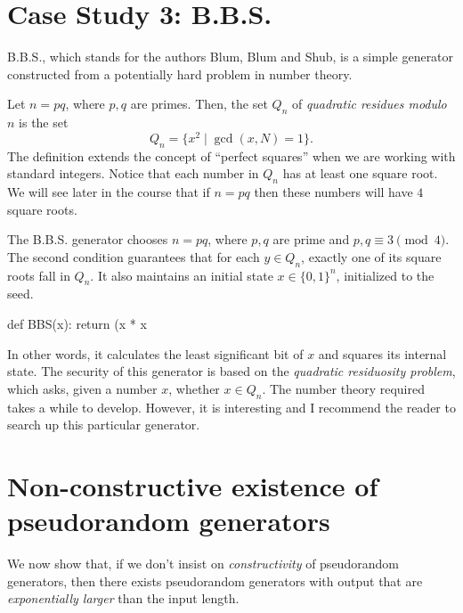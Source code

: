 \section{Case Study 3: B.B.S.}\label{Case-Study--BBS}

B.B.S., which stands for the authors Blum, Blum and Shub, is a simple
generator constructed from a potentially hard problem in number theory.

Let \(n=pq\), where \(p,q\) are primes. Then, the set \(Q_n\) of
\emph{quadratic residues modulo \(n\)} is the set
\[Q_n=\{x^2\mid \gcd(x,N)=1\}.\] The definition extends the concept of
``perfect squares'' when we are working with standard integers. Notice
that each number in \(Q_n\) has at least one square root. We will see
later in the course that if \(n=pq\) then these numbers will have \(4\)
square roots.

The B.B.S. generator chooses \(n=pq\), where \(p,q\) are prime and
\(p,q\equiv 3\pmod{4}\). The second condition guarantees that for each
\(y\in Q_n\), exactly one of its square roots fall in \(Q_n\). It also
maintains an initial state \(x\in\{0,1\}^n\), initialized to the seed.

\begin{code}
def BBS(x):
    return (x * x %
\end{code}

In other words, it calculates the least significant bit of \(x\) and
squares its internal state. The security of this generator is based on
the \emph{quadratic residuosity problem}, which asks, given a number
\(x\), whether \(x\in Q_n\). The number theory required takes a while to
develop. However, it is interesting and I recommend the reader to search
up this particular generator.

\section{Non-constructive existence of pseudorandom
generators}\label{Non-constructive-existence-of-}

We now show that, if we don't insist on \emph{constructivity} of
pseudorandom generators, then there exists pseudorandom generators with
output that are \emph{exponentially larger} than the input length.

\hypertarget{prgexist}{}


